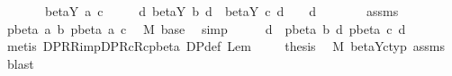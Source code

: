 \begin{isabellebody}
\ \ \ \ \ \ \ {\isachardoublequoteopen}beta{\isacharunderscore}Y{\isacharasterisk}\ a\ c{\isachardoublequoteclose}\isanewline
\ \ \ \ \ {\isachardoublequoteopen}{\isasymexists}d{\isachardot}\ beta{\isacharunderscore}Y{\isacharasterisk}\ b\ d\ {\isasymand}\ beta{\isacharunderscore}Y{\isacharasterisk}\ c\ d\ {\isasymand}\ {\isasymGamma}\ {\isasymturnstile}\ d\ {\isacharcolon}\ {\isasymsigma}{\isachardoublequoteclose}\isanewline
%
\isadelimproof
%
\endisadelimproof
%
\isatagproof
{}\isamarkupfalse%
\ {\isacharminus}\isanewline
\ \ \isamarkupfalse%
\ assms\ \isamarkupfalse%
\ {\isachardoublequoteopen}pbeta{\isacharasterisk}\ a\ b{\isachardoublequoteclose}\ {\isachardoublequoteopen}pbeta{\isacharasterisk}\ a\ c{\isachardoublequoteclose}\ \isamarkupfalse%
\ M{}\ base\ \isamarkupfalse%
\ simp{\isacharplus}\isanewline
\ \ \isamarkupfalse%
\ \isamarkupfalse%
\ d\ \ {\isachardoublequoteopen}pbeta{\isacharasterisk}\ b\ d{\isachardoublequoteclose}\ {\isachardoublequoteopen}pbeta{\isacharasterisk}\ c\ d{\isachardoublequoteclose}\ \isamarkupfalse%
\ {\isacharparenleft}metis\ DP{\isacharunderscore}R{\isacharunderscore}R{\isacharunderscore}imp{\isacharunderscore}DP{\isacharunderscore}Rc{\isacharunderscore}Rc{\isacharunderscore}pbeta\ DP{\isacharunderscore}def\ Lem{}{\isacharunderscore}{}{\isacharunderscore}{}{\isacharparenright}\ \isanewline
\ \ \isamarkupfalse%
\ {\isacharquery}thesis\ \isamarkupfalse%
\ M{}\ beta{\isacharunderscore}Y{\isacharunderscore}c{\isacharunderscore}typ\ assms\ \isamarkupfalse%
\ blast\isanewline
{}\isamarkupfalse%
%
\endisatagproof
{\isafoldproof}%
%
\isadelimproof
\isanewline
%
\endisadelimproof
%
\isadelimtheory
%
\endisadelimtheory
%
\isatagtheory
{}\isamarkupfalse%
%
\endisatagtheory
{\isafoldtheory}%
%
\isadelimtheory
%
\endisadelimtheory
%
\end{isabellebody}%
